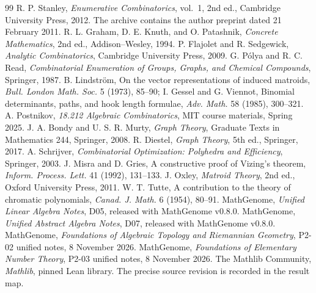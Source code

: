 \documentclass[11pt,oneside,openany]{book}
\theoremstyle{plain}
\theoremstyle{definition}
\theoremstyle{remark}
\begin{document}
\backmatter
\begin{thebibliography}{99}
 R. P. Stanley, \emph{Enumerative Combinatorics},
  vol.~1, 2nd ed., Cambridge University Press, 2012. The archive
  contains the author preprint dated 21 February 2011.
 R. L. Graham, D. E. Knuth, and O. Patashnik,
  \emph{Concrete Mathematics}, 2nd ed., Addison--Wesley, 1994.
 P. Flajolet and R. Sedgewick, \emph{Analytic Combinatorics},
  Cambridge University Press, 2009.
 G. P\'olya and R. C. Read,
  \emph{Combinatorial Enumeration of Groups, Graphs, and Chemical Compounds},
  Springer, 1987.
 B. Lindstr\"om, On the vector representations of induced
  matroids, \emph{Bull. London Math. Soc.} 5 (1973), 85--90;
  I. Gessel and G. Viennot, Binomial determinants, paths, and hook length
  formulae, \emph{Adv. Math.} 58 (1985), 300--321.
 A. Postnikov, \emph{18.212 Algebraic Combinatorics},
  MIT course materials, Spring 2025.
 J. A. Bondy and U. S. R. Murty, \emph{Graph Theory},
  Graduate Texts in Mathematics 244, Springer, 2008.
 R. Diestel, \emph{Graph Theory}, 5th ed., Springer, 2017.
 A. Schrijver, \emph{Combinatorial Optimization:
  Polyhedra and Efficiency}, Springer, 2003.
 J. Misra and D. Gries, A constructive proof of Vizing's
  theorem, \emph{Inform. Process. Lett.} 41 (1992), 131--133.
 J. Oxley, \emph{Matroid Theory}, 2nd ed.,
  Oxford University Press, 2011.
 W. T. Tutte, A contribution to the theory of chromatic
  polynomials, \emph{Canad. J. Math.} 6 (1954), 80--91.
 MathGenome, \emph{Unified Linear Algebra Notes},
  D05, released with MathGenome v0.8.0.
 MathGenome, \emph{Unified Abstract Algebra Notes},
  D07, released with MathGenome v0.8.0.
 MathGenome, \emph{Foundations of Algebraic Topology
  and Riemannian Geometry}, P2-02 unified notes, 8 November 2026.
 MathGenome, \emph{Foundations of Elementary Number Theory},
  P2-03 unified notes, 8 November 2026.
 The Mathlib Community, \emph{Mathlib}, pinned Lean library.
  The precise source revision is recorded in the result map.
\end{thebibliography}
\end{document}
